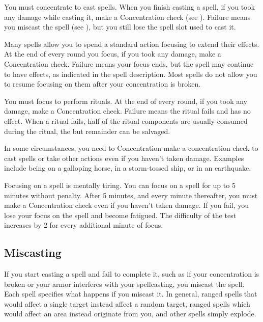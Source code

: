          You must concentrate to cast spells. When you finish casting a spell, if you took any damage while casting it, make a Concentration check (see ). Failure means you miscast the spell (see ), but you still lose the spell slot used to cast it.

         Many spells allow you to spend a standard action focusing to extend their effects. At the end of every round you focus, if you took any damage, make a Concentration check. Failure means your focus ends, but the spell may continue to have effects, as indicated in the spell description. Most spells do not allow you to resume focusing on them after your concentration is broken.

         You must focus to perform rituals. At the end of every round, if you took any damage, make a Concentration check. Failure means the ritual fails and has no effect. When a ritual fails, half of the ritual components are usually consumed during the ritual, the but remainder can be salvaged.

         In some circumstances, you need to Concentration make a concentration check to cast spells or take other actions even if you haven't taken damage. Examples include being on a galloping horse, in a storm-tossed ship, or in an earthquake.

         Focusing on a spell is mentally tiring. You can focus on a spell for up to 5 minutes without penalty. After 5 minutes, and every minute thereafter, you must make a Concentration check even if you haven't taken damage. If you fail, you lose your focus on the spell and become fatigued. The difficulty of the test increases by 2 for every additional minute of focus.

    \subsection{Miscasting}\label{Miscasting}

        If you start casting a spell and fail to complete it, such as if your concentration is broken or your armor interferes with your spellcasting, you miscast the spell. Each spell specifies what happens if you miscast it. In general, ranged spells that would affect a single target instead affect a random target, ranged spells which would affect an area instead originate from you, and other spells simply explode.

